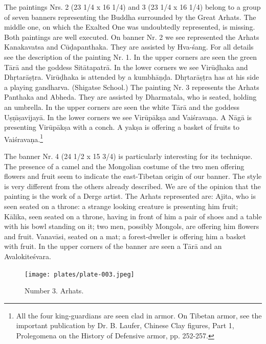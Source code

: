 \documentclass[a4paper, 12pt, oneside]{article}
\begin{document}
The paintings Nrs. 2 (23 1/4 x 16 1/4) and 3 (23 1/4 x 16 1/4) belong to a group of seven banners representing the Buddha surrounded by the Great Arhats. The middle one, on which the Exalted One was undoubtedly represented, is missing. Both paintings are well executed. On banner Nr. 2 we see represented the Arhats Kanakavatsa and C\={u}\d{d}apanthaka. They are assisted by Hva-\'{s}ang. For all details see the description of the painting Nr. 1. In the upper corners are seen the green T\={a}r\={a} and the goddess Sit\={a}tapatr\={a}. In the lower corners we see Vir\={u}\d{d}haka and Dh\d{r}tar\={a}\d{s}\d{t}ra. Vir\={u}\d{d}haka is attended by a kumbh\={a}\d{n}\d{d}a. Dh\d{r}tar\={a}\d{s}\d{t}ra has at his side a playing gandharva. (Shigatse School.) The painting Nr. 3 represents the Arhats Panthaka and Abheda. They are assisted by Dharmatala, who is seated, holding an umbrella. In the upper corners are seen the white T\={a}r\={a} and the goddess U\d{s}\d{n}\={\i}\d{s}avijay\={a}. In the lower corners we see Vir\={u}p\={a}k\d{s}a and Vai\'{s}rava\d{n}a. A N\={a}g\={a} is presenting Vir\={u}p\={a}k\d{s}a with a conch. A yak\d{s}a is offering a basket of fruits to Vai\'{s}rava\d{n}a.\footnote{All the four king-guardians are seen clad in armor. On Tibetan armor, see the important publication by Dr. B. Laufer, Chinese Clay figures, Part 1, Prolegomena on the History of Defensive armor, pp. 252-257.}

The banner Nr. 4 (24 1/2 x 15 3/4) is particularly interesting for its technique. The presence of a camel and the Mongolian costume of the two men offering flowers and fruit seem to indicate the east-Tibetan origin of our banner. The style is very different from the others already described. We are of the opinion that the painting is the work of a Derge artist. The Arhats represented are: Ajita, who is seen seated on a throne: a strange looking creature is presenting him fruit; K\={a}lika, seen seated on a throne, having in front of him a pair of shoes and a table with his bowl standing on it; two men, possibly Mongols, are offering him flowers and fruit. Vanav\={a}si, seated on a mat; a forest-dweller is offering him a basket with fruit. In the upper corners of the banner are seen a T\={a}r\={a} and an Avalokite\'{s}vara.

\clearpage
\vspace*{\fill}
\begin{figure}[H]
\centering
\texttt{[image: plates/plate-003.jpeg]}
\caption*{Number 3. Arhats.}
\end{figure}
\vspace*{\fill}
\clearpage
\end{document}
